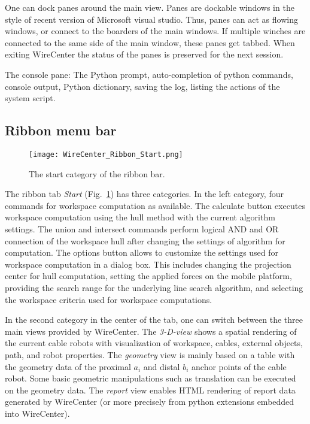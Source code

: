 \documentclass[11pt,a4paper,onepage,openany]{book}
\begin{document}
One can dock panes around the main view. Panes are dockable windows in the
style of recent version of Microsoft visual studio. Thus, panes can act as
flowing windows, or connect to the boarders of the main windows. If multiple
winches are connected to the same side of the main window, these panes get
tabbed. When exiting WireCenter the status of the panes is preserved for the
next session.

The console pane: The Python prompt, auto-completion of python commands,
console output, Python dictionary, saving the log, listing the actions of the
system script.

\subsection{Ribbon menu bar}
\begin{figure}[t]
  \centering
  \texttt{[image: WireCenter\_Ribbon\_Start.png]}
  \caption{The start category of the ribbon bar.}\label{fig:WireCenterRibbonStart}
\end{figure}
The ribbon tab \emph{Start} (Fig.~\ref{fig:WireCenterRibbonStart}) has three
categories. In the left category, four commands for workspace computation as
available. The calculate button executes workspace computation using the hull
method with the current algorithm settings. The union and intersect commands
perform logical AND and OR connection of the workspace hull after changing the
settings of algorithm for  computation. The options button allows to customize
the settings used for workspace computation in a dialog box. This includes
changing the projection center for hull computation, setting the applied forces
on the mobile platform, providing the search range for the underlying line search
algorithm, and selecting the workspace criteria used for workspace computations.

In the second category in the center of the tab, one can switch between the three
main views provided by WireCenter. The \emph{3-D-view} shows a spatial rendering
of the current cable robots with visualization of workspace, cables, external
objects, path, and robot properties. The \emph{geometry} view is mainly based on
a table with the geometry data of the proximal $a_i$ and distal $b_i$ anchor
points of the cable robot. Some basic geometric manipulations such as translation
can be executed on the geometry data. The \emph{report} view enables HTML rendering
of report data generated by WireCenter (or more precisely from python extensions
embedded into WireCenter).
\end{document}
